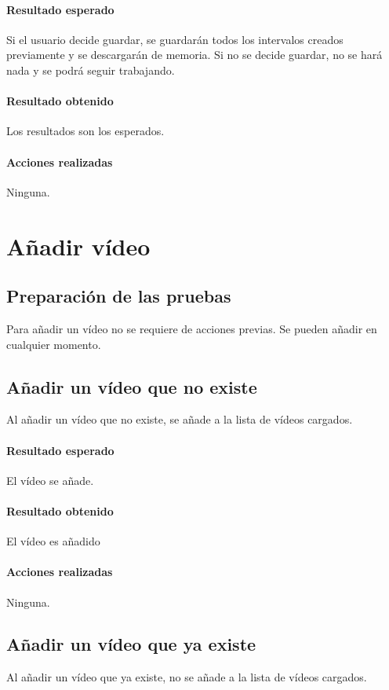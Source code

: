 \paragraph{Resultado esperado}
Si el usuario decide guardar, se guardar\'an todos los intervalos
creados previamente y se descargar\'an de memoria. Si no se decide
guardar, no se har\'a nada y se podr\'a seguir trabajando.

\paragraph{Resultado obtenido}
Los resultados son los esperados.

\paragraph{Acciones realizadas}
Ninguna.

\section{A\~nadir v\'ideo}
\subsection{Preparaci\'on de las pruebas}
Para a\~nadir un v\'ideo no se requiere de acciones previas.
Se pueden a\~nadir en cualquier momento.

\subsection{A\~nadir un v\'ideo que no existe}
Al a\~nadir un v\'ideo que no existe, se a\~nade a la lista
de v\'ideos cargados.

\paragraph{Resultado esperado}
El v\'ideo se a\~nade.

\paragraph{Resultado obtenido}
El v\'ideo es a\~nadido

\paragraph{Acciones realizadas}
Ninguna.

\subsection{A\~nadir un v\'ideo que ya existe}
Al a\~nadir un v\'ideo que ya existe, no se a\~nade
a la lista de v\'ideos cargados.

